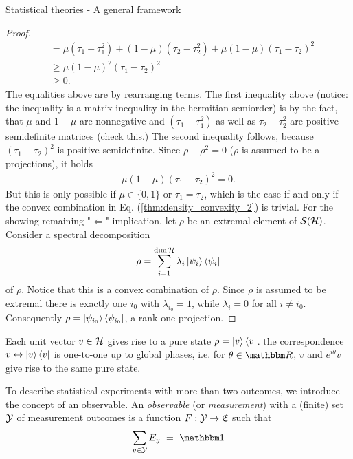 \begin{section}{Statistical theories - A general framework}
\begin{proof}
\begin{align*}
  	&= \mu (\tau_1 - \tau_1^2) + (1- \mu) (\tau_2 - \tau_2^2) + \mu(1-\mu) (\tau_1 - \tau_2)^2 \\
  	&\geq \mu(1-\mu)^2 (\tau_1 - \tau_2)^2 \\
  	&\geq 0.
  	\end{align*}
  	The equalities above are by rearranging terms. The first inequality above (notice: the inequality is a matrix inequality in the hermitian semiorder) is by
  	the fact, that $\mu$ and $1 -\mu$ are nonnegative and $(\tau_1 - \tau_1^2)$ as well as $\tau_2 - \tau_2^2$ are positive semidefinite matrices (check this.) 
  	The second inequality follows, because $(\tau_1 - \tau_2)^2$ is positive semidefinite. Since $\rho - \rho^2 = 0$ ($\rho$ is assumed to be a projections),
  	it holds 
  	\begin{align}
  	\mu (1 - \mu) (\tau_1 - \tau_2)^2 = 0.
  	\end{align}
  	But this is only possible if $\mu \in \{0,1\}$ or $\tau_1 = \tau_2$, which is the case if and only if the convex combination in Eq. (\ref{thm:density_convexity_2})
  	is trivial. \newline 
  	For the showing remaining "$\Leftarrow$" implication, let $\rho$ be an extremal element of ${\mathcal S}({\mathcal H})$. Consider a spectral decomposition 
  	\begin{align}
  	\rho = \sum_{i=1}^{\dim {\mathcal H}} \lambda_i \ket{\psi_i}\bra{\psi_i}
  	\end{align}
  	of $\rho$. Notice that this is a convex combination of $\rho$. Since $\rho$ is assumed to be extremal there is exactly one $i_0$ with $\lambda_{i_0} =1$, while $\lambda_i = 0$
  	for all $i \neq i_0$. Consequently
  	$\rho = \ket{\psi_{i_0}}\bra{\psi_{i_0}}$,
  	a rank one projection.
  \end{proof}
  \begin{remark}
  	Each unit vector $v \in {\mathcal H}$ gives rise to a pure state $\rho = \ket{v}\bra{v}$. 
  	the correspondence $v \leftrightarrow \ket{v}\bra{v}$ is one-to-one up to global phases, i.e. for $\theta \in \bbmR$, $v$ and $e^{i\theta} v$ give rise to the same pure 
  	state. 
  \end{remark}
   To describe statistical experiments with more than two outcomes, we introduce the concept of an observable. An \emph{observable} (or \emph{measurement})   with a (finite) set ${\mathcal Y}$ of measurement outcomes is a function $F: {\mathcal Y} \rightarrow {\mathfrak E}$ such that 
   \begin{align}
    \sum_{y \in \cY} E_y \ = \ \bbmeins

\end{align}
\end{section}
